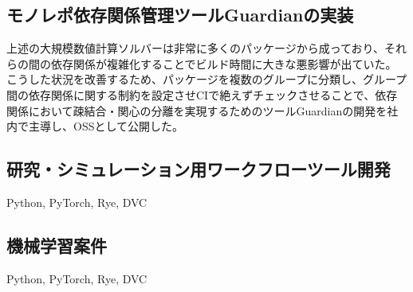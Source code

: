 \documentclass[a4j,draft]{ltjsarticle}
\begin{document}
\begin{refsection}
\subsection*{モノレポ依存関係管理ツールGuardianの実装}

上述の大規模数値計算ソルバーは非常に多くのパッケージから成っており、それらの間の依存関係が複雑化することでビルド時間に大きな悪影響が出ていた。
こうした状況を改善するため、パッケージを複数のグループに分類し、グループ間の依存関係に関する制約を設定させCIで絶えずチェックさせることで、依存関係において疎結合・関心の分離を実現するためのツールGuardianの開発を社内で主導し、OSSとして公開した。

\subsection*{研究・シミュレーション用ワークフローツール開発}

Python, PyTorch, Rye, DVC 

\subsection*{機械学習案件}

Python, PyTorch, Rye, DVC 


\end{refsection}
\end{document}
